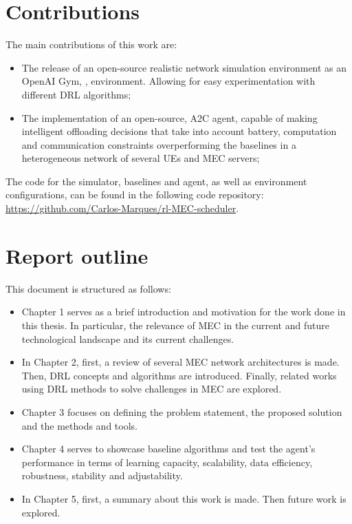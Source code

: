 \section{Contributions}
\noindent The main contributions of this work are:
\begin{itemize}
    \item The release of an open-source realistic network simulation environment as an OpenAI Gym, \cite{opengym}, environment. Allowing for easy experimentation with different \acrshort{DRL} algorithms;
    \item The implementation of an open-source, \acrshort{A2C} agent, capable of making intelligent offloading decisions that take into account battery, computation and communication constraints overperforming the baselines in a heterogeneous network of several \acrshort{UE}s and \acrshort{MEC} servers;
\end{itemize}

The code for the simulator, baselines and agent, as well as environment configurations, can be found in the following code repository:
\href{https://github.com/Carlos-Marques/rl-MEC-scheduler}{https://github.com/Carlos-Marques/rl-MEC-scheduler}.

\section{Report outline}
\noindent This document is structured as follows:
\begin{itemize}
    \item Chapter 1 serves as a brief introduction and motivation for the work done in this thesis. In particular, the relevance of \acrshort{MEC} in the current and future technological landscape and its current challenges.
    \item In Chapter 2, first, a review of several \acrshort{MEC} network architectures is made. Then, \acrshort{DRL} concepts  and  algorithms  are  introduced. Finally, related works using \acrshort{DRL} methods to solve challenges in \acrshort{MEC} are explored.
    \item Chapter 3 focuses on defining the problem statement, the proposed solution and the methods and tools.
    \item Chapter 4 serves to showcase baseline algorithms and test the agent's performance in terms of learning capacity, scalability, data efficiency, robustness, stability and adjustability. 
    \item In Chapter 5, first, a summary about this work is made. Then future work is explored.
\end{itemize}







 





